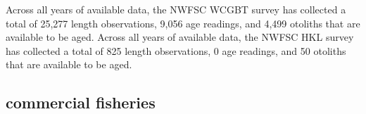 \documentclass[11pt,
  english,
  letterpaper,
]{article}
\begin{document}

Across all years of available data, the NWFSC WCGBT survey has collected a total of 25,277 length observations, 9,056 age readings, and 4,499 otoliths that are available to be aged. Across all years of available data, the NWFSC HKL survey has collected a total of 825 length observations, 0 age readings, and 50 otoliths that are available to be aged.

\leavevmode\tagmcend\tagstructend\par


\hypertarget{commercial-fisheries-28}{%
\subsection{commercial fisheries}\label{commercial-fisheries-28}}

\leavevmode\tagmcend\tagstructend


\begingroup\fontsize{10}{12}\selectfont \begingroup\fontsize{10}{12}\selectfont

\leavevmode\tagmcend\tagstructend\par
\end{document}
